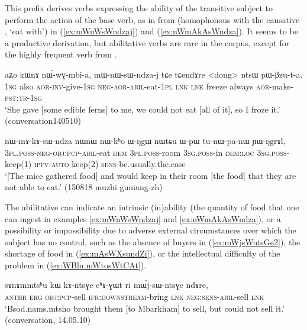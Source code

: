 This prefix derives verbs expressing the ability of the transitive subject to perform the action of the base verb, as in  from  (homophonous with the causative , `eat with') in (\ref{ex:mWnWsWndzaj}) and (\ref{ex:nWmAkAsWndza}). It seems to be a productive derivation, but abilitative verbs are rare in the corpus, except for the highly frequent verb  from .

\begin{exe}
\ex \label{ex:mWnWsWndzaj}
\gll aʑo kɯnɤ nɯ́-wɣ-mbi-a, mɯ-nɯ-sɯ-ndza-j tɕe tɕendɤre <dong> ntsɯ pɯ-βzu-t-a. \\
\textsc{1sg} also \textsc{aor}-\textsc{inv}-give-\textsc{1sg}  \textsc{neg}-\textsc{aor}-\textsc{abil}-eat-\textsc{1pl} \textsc{lnk} \textsc{lnk} freeze always \textsc{aor}-make-\textsc{pst}:\textsc{tr}-\textsc{1sg} \\
\glt `She gave [some edible ferns] to me, we could not eat [all of it], so I froze it.' (conversation140510)
\end{exe}

\begin{exe}
\ex \label{ex:nWmAkAsWndza}
\gll nɯ-mɤ-kɤ-sɯ-ndza nɯnɯ nɯ-kʰo ɯ-ŋgɯ nɯtɕu ɯ-pɯ tu-nɯ-pa-nɯ ɲɯ-ŋgrɤl, \\
\textsc{3pl}.\textsc{poss}-\textsc{neg}-\textsc{obj}:\textsc{pcp}-\textsc{abil}-eat \textsc{dem} \textsc{3pl}.\textsc{poss}-room \textsc{3sg}.\textsc{poss}-in \textsc{dem}:\textsc{loc} \textsc{3sg}.\textsc{poss}-keep(1) \textsc{ipfv}-\textsc{auto}-keep(2) \textsc{sens}-be.usually.the.case \\
\glt `[The mice gathered food] and would keep in their room [the food] that they are not able to eat.' (150818 muzhi guniang-zh)
\end{exe}

The abilitative can indicate an intrinsic (in)ability (the quantity of food that one can ingest in examples \ref{ex:mWnWsWndzaj} and \ref{ex:nWmAkAsWndza}), or a possibility or impossibility due to adverse external circumstances over which the subject has no control, such as the absence of buyers in (\ref{ex:mWjsWntsGe2}), the shortage of food in (\ref{ex:mAsWXsundZi}), or the intellectual difficulty of the problem in (\ref{ex:WBlu.mWtosWtCAt}).

 \begin{exe}
\ex \label{ex:mWjsWntsGe2}
 \gll   sɤnɤmmtsʰu kɯ kɤ-ntsɣe cʰɤ-ɣɯt ri mɯ́j-sɯ-ntsɣe ndɤre, \\
  \textsc{anthr} \textsc{erg} \textsc{obj}:\textsc{pcp}-sell \textsc{ifr}:\textsc{downstream}-bring \textsc{lnk} \textsc{neg}:\textsc{sens}-\textsc{abil}-sell \textsc{lnk} \\
\glt `Bsod.nams.mtsho brought them [to Mbarkham] to sell, but could not sell it.' (conversation, 14.05.10)
 \end{exe}
 
